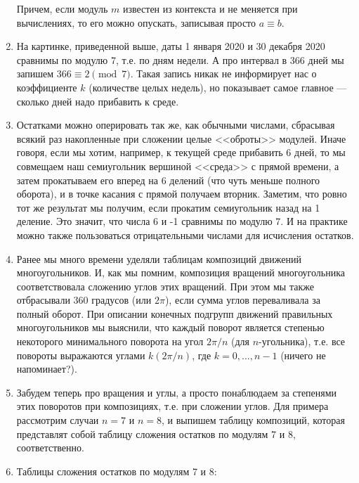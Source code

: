 \begin{enumerate}
Причем, если модуль $m$ известен из контекста и не меняется при вычислениях, то его можно опускать, записывая просто $a\equiv b$. 

\item На картинке, приведенной выше, даты 1 января 2020 и 30 декабря 2020 сравнимы по модулю 7, т.е. по дням недели.
А про интервал в 366 дней мы запишем $366\equiv 2\pmod 7$. Такая запись никак не информирует нас о коэффициенте $k$ (количестве целых недель), но показывает самое главное --- сколько дней надо прибавить к среде.



\item Остатками можно оперировать так же, как обычными числами, сбрасывая всякий раз накопленные при сложении целые <<оброты>> модулей. Иначе говоря, если мы хотим, например, к текущей среде прибавить 6 дней, то мы совмещаем наш семиугольник вершиной <<среда>> с прямой времени, а затем прокатываем его вперед на 6 делений (что чуть меньше полного оборота), и в точке касания с прямой получаем вторник. Заметим, что ровно тот же результат мы получим, если прокатим семиугольник назад на 1 деление. Это значит, что числа 6 и -1 сравнимы по модулю 7. И на практике можно также пользоваться отрицательными числами для исчисления остатков.
\item Ранее мы много времени уделяли таблицам композиций движений многоугольников. И, как мы помним, композиция вращений многоугольника соответствовала сложению углов этих вращений. При этом мы также отбрасывали 360 градусов (или $2\pi$), если сумма углов переваливала за полный оборот. При описании конечных подгрупп движений правильных многоугольников мы выяснили, что каждый поворот является степенью некоторого минимального поворота на угол $2\pi/n$ (для $n$-угольника), т.е. все повороты выражаются углами $k(2\pi/n)$, где $k=0,\dots,n-1$ (ничего не напоминает?).
\item Забудем теперь про вращения и углы, а просто понаблюдаем за степенями этих поворотов при композициях, т.е. при сложении углов. Для примера рассмотрим случаи $n=7$ и $n=8$, и выпишем таблицу композиций, которая представлят собой таблицу сложения остатков по модулям 7 и 8, соответственно.
\item Таблицы сложения остатков по модулям 7 и 8:
\begin{center}
\begin{tabular}{c||c|c|c|c|c|c|c|}

\end{tabular}
\end{center}
\end{enumerate}
